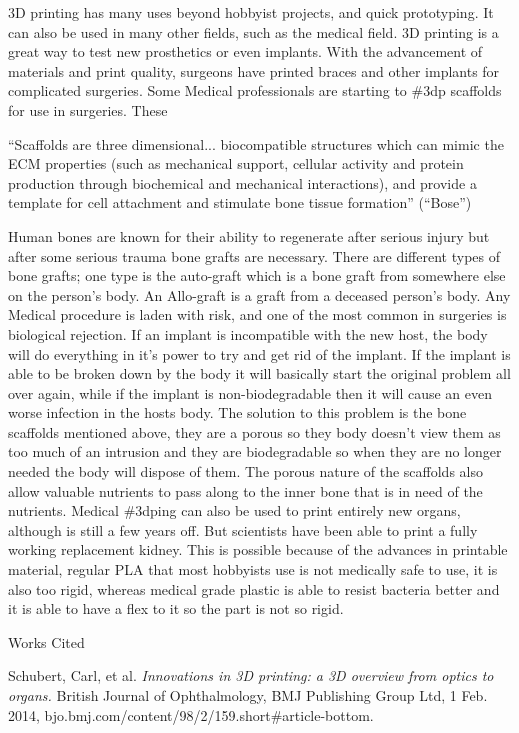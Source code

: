 \documentclass[12pt]{article}
\newcommand{\bibent}{\noindent \hangindent 40pt}
\newenvironment{workscited}{\newpage \begin{center} Works Cited \end{center}}{\newpage }
\begin{document}
\begin{flushleft}
3D printing has many uses beyond hobbyist projects, and quick prototyping. It can also be used in many other fields, such as the medical field. 3D printing is a great way to test new prosthetics or even implants. With the advancement of materials and print quality, surgeons have printed braces and other implants for complicated surgeries. Some Medical professionals are starting to \#3dp scaffolds for use in surgeries. These 
\begin{displayquote}
``Scaffolds are three dimensional... biocompatible structures which can mimic the ECM properties (such as mechanical support, cellular activity and protein production through biochemical and mechanical interactions), and provide a template for cell attachment and stimulate bone tissue formation'' (``Bose'')
\end{displayquote}
Human bones are known for their ability to regenerate after serious injury but after some serious trauma bone grafts are necessary. There are different types of bone grafts; one type is the auto-graft which is a bone graft from somewhere else on the person's body. An Allo-graft is a graft from a deceased person's body. Any Medical procedure is laden with risk, and one of the most common in surgeries is biological rejection. If an implant is incompatible with the new host, the body will do everything in it's power to try and get rid of the implant. If the implant is able to be broken down by the body it will basically start the original problem all over again, while if the implant is non-biodegradable then it will cause an even worse infection in the hosts body. The solution to this problem is the bone scaffolds mentioned above, they are a porous so they body doesn't view them as too much of an intrusion and they are biodegradable so when they are no longer needed the body will dispose of them. The porous nature of the scaffolds also allow valuable nutrients to pass along to the inner bone that is in need of the nutrients. Medical \#3dping can also be used to print entirely new organs, although is still a few years off. But scientists have been able to print a fully working replacement kidney. This is possible because of the advances in printable material, regular PLA that most hobbyists use is not medically safe to use, it is also too rigid, whereas medical grade plastic is able to resist bacteria better and it is able to have a flex to it so the part is not so rigid. 

\begin{workscited}

\bibent
Schubert, Carl, et al. \textit{Innovations in 3D printing: a 3D overview from optics to organs.} British Journal of Ophthalmology, BMJ Publishing Group Ltd, 1 Feb. 2014, bjo.bmj.com/content/98/2/159.short\#article-bottom.


\end{workscited}
\end{flushleft}
\end{document}

